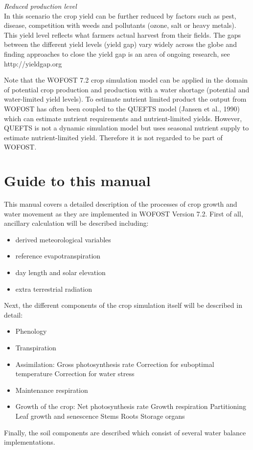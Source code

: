 {\it Reduced production level\/}\\
In this scenario the crop yield can be further reduced by factors such as pest, disease, competition with weeds
and pollutants (ozone, salt or heavy metals). This yield level reflects what farmers actual
harvest from their fields. The gaps between the different yield levels (yield gap) vary widely
across the globe and finding approaches to close the yield gap is an area of ongoing research,
see http://yieldgap.org

Note that the WOFOST 7.2 crop simulation model can be applied in the domain of potential crop
production and production with a water shortage (potential and water-limited yield levels). 
To estimate nutrient limited product the output from WOFOST has often been coupled to the QUEFTS
model (Jansen et al., 1990) which can estimate nutrient requirements and nutrient-limited yields.
However, QUEFTS is not a dynamic simulation model but uses seasonal nutrient supply to estimate
nutrient-limited yield. Therefore it is not regarded to be part of WOFOST.

\section{Guide to this manual}

This manual covers a detailed description of the processes of crop growth and water movement as they are
implemented in WOFOST Version 7.2. First of all, ancillary calculation will be described including:
\begin{itemize}
	\item derived meteorological variables
	\item reference evapotranspiration
	\item day length and solar elevation
	\item extra terrestrial radiation
\end{itemize}

Next, the different components of the crop simulation itself will be described in detail:
\begin{itemize}
	\item Phenology
	\item Transpiration
	\item Assimilation:
	\subitem Gross photosynthesis rate
	\subitem Correction for suboptimal temperature
	\subitem Correction for water stress
	\item Maintenance respiration
	\item Growth of the crop:
	\subitem Net photosynthesis rate
	\subitem Growth respiration
	\subitem Partitioning
	\subitem Leaf growth and senescence 
	\subitem Stems
	\subitem Roots
	\subitem Storage organs	
\end{itemize}

Finally, the soil components are described which consist of several water balance implementations.